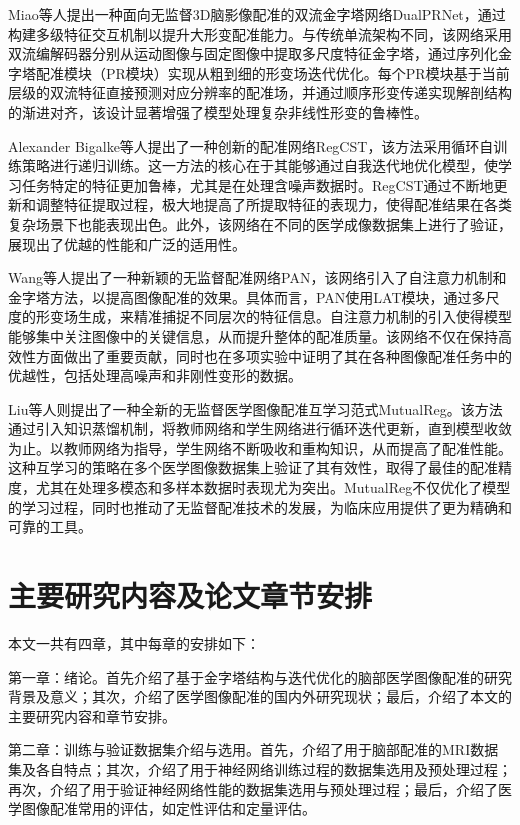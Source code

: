 Miao\cite{kang2022dual}等人提出一种面向无监督3D脑影像配准的双流金字塔网络DualPRNet，通过构建多级特征交互机制以提升大形变配准能力。与传统单流架构不同，该网络采用双流编解码器分别从运动图像与固定图像中提取多尺度特征金字塔，通过序列化金字塔配准模块（PR模块）实现从粗到细的形变场迭代优化。每个PR模块基于当前层级的双流特征直接预测对应分辨率的配准场，并通过顺序形变传递实现解剖结构的渐进对齐，该设计显著增强了模型处理复杂非线性形变的鲁棒性。

Alexander Bigalke等人提出了一种创新的配准网络RegCST\cite{bigalke2023unsupervised}，该方法采用循环自训练策略进行递归训练。这一方法的核心在于其能够通过自我迭代地优化模型，使学习任务特定的特征更加鲁棒，尤其是在处理含噪声数据时。RegCST通过不断地更新和调整特征提取过程，极大地提高了所提取特征的表现力，使得配准结果在各类复杂场景下也能表现出色。此外，该网络在不同的医学成像数据集上进行了验证，展现出了优越的性能和广泛的适用性。

Wang等人提出了一种新颖的无监督配准网络PAN\cite{wang2024pyramid}，该网络引入了自注意力机制和金字塔方法，以提高图像配准的效果。具体而言，PAN使用LAT模块，通过多尺度的形变场生成，来精准捕捉不同层次的特征信息。自注意力机制的引入使得模型能够集中关注图像中的关键信息，从而提升整体的配准质量。该网络不仅在保持高效性方面做出了重要贡献，同时也在多项实验中证明了其在各种图像配准任务中的优越性，包括处理高噪声和非刚性变形的数据。

Liu等人则提出了一种全新的无监督医学图像配准互学习范式MutualReg\cite{liu2024mutualreg}。该方法通过引入知识蒸馏机制，将教师网络和学生网络进行循环迭代更新，直到模型收敛为止。以教师网络为指导，学生网络不断吸收和重构知识，从而提高了配准性能。这种互学习的策略在多个医学图像数据集上验证了其有效性，取得了最佳的配准精度，尤其在处理多模态和多样本数据时表现尤为突出。MutualReg不仅优化了模型的学习过程，同时也推动了无监督配准技术的发展，为临床应用提供了更为精确和可靠的工具。


\section{主要研究内容及论文章节安排}

本文一共有四章，其中每章的安排如下：

第一章：绪论。首先介绍了基于金字塔结构与迭代优化的脑部医学图像配准的研究背景及意义；其次，介绍了医学图像配准的国内外研究现状；最后，介绍了本文的主要研究内容和章节安排。

第二章：训练与验证数据集介绍与选用。首先，介绍了用于脑部配准的MRI数据集及各自特点；其次，介绍了用于神经网络训练过程的数据集选用及预处理过程；再次，介绍了用于验证神经网络性能的数据集选用与预处理过程；最后，介绍了医学图像配准常用的评估，如定性评估和定量评估。


